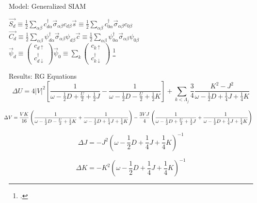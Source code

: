 \documentclass[aspectratio=169]{beamer}
\begin{document}
\begin{frame}{Model: Generalized SIAM}
\begin{center}
\end{center}
\vspace*{30pt}
\hspace*{\fill}\(\vec{S_d} \equiv \frac{1}{2}\sum_{\alpha\beta}c^\dagger_{d\alpha}\vec{\sigma}_{\alpha\beta}c_{d\beta}\)\hspace*{\fill}\(\vec{s} \equiv \frac{1}{2}\sum_{\alpha\beta}c^\dagger_{0\alpha}\vec{\sigma}_{\alpha\beta}c_{0\beta}\)\hspace*{\fill}
\\
\vspace*{15pt}
\hspace*{\fill}\(\vec{C_d} \equiv \frac{1}{2}\sum_{\alpha\beta}\psi^\dagger_{d\alpha}\vec{\sigma}_{\alpha\beta}\psi_{d\beta}\)\hspace*{\fill}\(\vec{c} \equiv \frac{1}{2}\sum_{\alpha\beta}\psi^\dagger_{0\alpha}\vec{\sigma}_{\alpha\beta}\psi_{0\beta}\)\hspace*{\fill}
\\
\vspace*{15pt}
\hspace*{\fill}\(\vec{\psi}_d \equiv \begin{pmatrix} c_{d \uparrow} \\ c^\dagger_{d \downarrow}\end{pmatrix} \)\hspace*{\fill}\(\vec{\psi}_0 \equiv \sum_k \begin{pmatrix} c_{k \uparrow} \\ c^\dagger_{k \downarrow}\end{pmatrix}\)\hspace*{\fill}
\footcite{Schrieffer_Wolff}
\end{frame}

\begin{frame}{Results: RG Equations}
\[
\Delta U = 4|V|^2 \left[\frac{1}{\omega - \frac{1}{2}D + \frac{U}{2} + \frac{1}{2}J}  - \frac{1}{\omega - \frac{1}{2}D - \frac{U}{2} + \frac{1}{2}K}\right] + \sum_{k<\Lambda_j} \frac{3}{4}\frac{K^2 - J^2}{\omega - \frac{1}{2}D + \frac{1}{4}J + \frac{1}{4}K}
\]

\[
	\hspace*{-10pt}\Delta V = \frac{V K}{16}\left(\frac{1}{\omega - \frac{1}{2}D - \frac{U}{2} + \frac{1}{2}K} + \frac{1}{\omega - \frac{1}{2}D + \frac{1}{4}J + \frac{1}{4}K} \right) - \frac{3VJ}{4}\left( \frac{1}{\omega - \frac{1}{2}D + \frac{U}{2} + \frac{1}{2}J} + \frac{1}{\omega - \frac{1}{2}D + \frac{1}{4}J + \frac{1}{4}K} \right)
\]

\[
\Delta J = - J^2\left(\omega - \frac{1}{2}D + \frac{1}{4}J + \frac{1}{4}K\right)^{-1}
\]

\[
\Delta K = - K^2\left(\omega - \frac{1}{2}D + \frac{1}{4}J + \frac{1}{4}K\right)^{-1}
\]
\end{frame}
\end{document}
